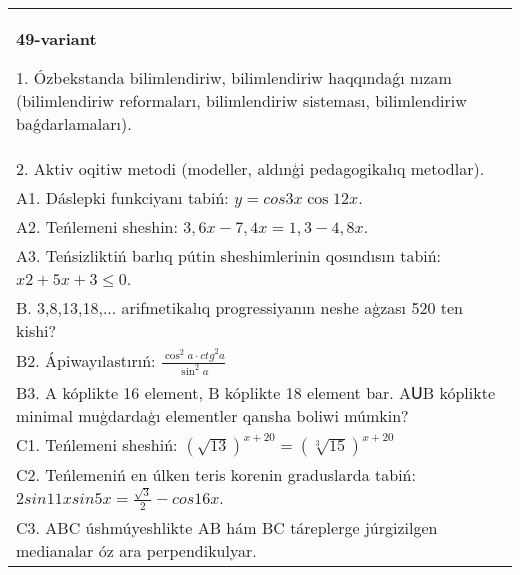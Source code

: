 \documentclass{article}
\begin{document}
\begin{tabular}{m{17cm}}
\textbf{49-variant}

1. Ózbekstanda bilimlendiriw, bilimlendiriw haqqındaǵı nızam (bilimlendiriw reformaları, bilimlendiriw sisteması, bilimlendiriw baǵdarlamaları). \\
2. Aktiv oqitiw metodi (modeller, aldınģi pedagogikalıq metodlar). \\
A1. Dáslepki funkciyanı tabiń: \(y=cos{3x}\cos{12x}\). \\
A2. Teńlemeni sheshin: \(3,6x - 7,4x = 1,3 - 4,8x\). \\
A3. Teńsizliktiń barlıq pútin sheshimlerinin qosındısın tabiń: \(x2 + 5x + 3 \leq 0\). \\
B. 3,8,13,18,... arifmetikalıq progressiyanın neshe aģzası 520 ten kishi? \\
B2. Ápiwayılastırıń: \(\frac{\cos^{2}a \cdot {ctg}^{2}a}{\sin^{2}a}\) \\
B3. A kóplikte 16 element, B kóplikte 18 element bar. AՍB kóplikte minimal muģdardaģı elementler qansha boliwi múmkin? \\
C1. Teńlemeni sheshiń: \((\sqrt{13}) ^{x + 20} = (\sqrt[3]{15}) ^{x + 20}\) \\
C2. Teńlemeniń en úlken teris korenin graduslarda tabiń: \(2sin11xsin5x = \frac{\sqrt{3}}{2} - cos16x\). \\
C3. ABC úshmúyeshlikte AB hám BC táreplerge júrgizilgen medianalar óz ara perpendikulyar. \\

\end{tabular}
\vspace{1cm}
\end{document}
